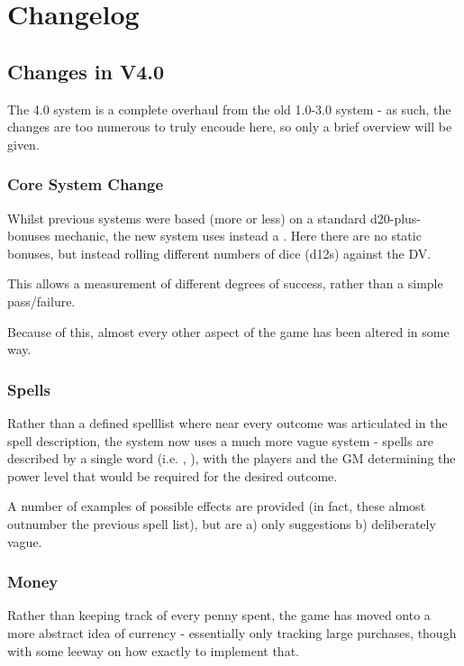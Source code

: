 \twocolumn
\chapter{Changelog}

\section{Changes in V4.0}

The 4.0 system is a complete overhaul from the old 1.0-3.0 system - as such, the changes are too numerous to truly encoude here, so only a brief overview will be given.

\subsection{Core System Change}

Whilst previous systems were based (more or less) on a standard d20-plus-bonuses mechanic, the new system uses instead a . Here there are no static bonuses, but instead rolling different numbers of dice (d12s) against the DV. 

This allows a measurement of different degrees of success, rather than a simple pass/failure. 

Because of this, almost every other aspect of the game has been altered in some way. 

\subsection{Spells}

Rather than a defined spelllist where near every outcome was articulated in the spell description, the system now uses a much more vague system - spells are described by a single word (i.e. , ), with the players and the GM determining the power level that would be required for the desired outcome. 

A number of examples of possible effects are provided (in fact, these almost outnumber the previous spell list), but are a) only suggestions b) deliberately vague. 

\subsection{Money}

Rather than keeping track of every penny spent, the game has moved onto a more abstract idea of currency - essentially only tracking large purchases, though with some leeway on how exactly to implement that.
